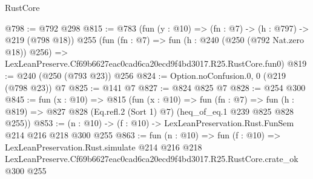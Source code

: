 \begin{lexlean}{RustCore}
\begin{coremodule}
@798 := @792 @298
@815 := @783
    (fun (y : @10) => (fn : @7) -> (h : @797) -> @219 (@798 @18))
    @255
    (fun (fn : @7) =>
    fun (h : @240 (@250 (@792 Nat.zero @18)) @256) =>
    LexLeanPreserve.Cf69b6627eac0cad6ca20ecd9f4bd3017.R25.RustCore.fun0)
@819 := @240 (@250 (@793 @23)) @256
@824 := Option.noConfusion.{0, 0} (@219 (@798 @23)) @7
@825 := @141 @7
@827 := @824 @825 @7
@828 := @254 @300
@845 := fun (x : @10) =>
  @815
    (fun (x : @10) =>
    fun (fn : @7) =>
    fun (h : @819) => @827 @828 (Eq.refl.{2} (Sort 1) @7) (heq_of_eq.{1} @239 @825 @828 @255))
@853 := (n : @10) -> (f : @10) -> LexLeanPreservation.Rust.FunSem @214 @216 @218 @300 @255
@863 := fun (n : @10) =>
  fun (f : @10) =>
  LexLeanPreservation.Rust.simulate
    @214
    @216
    @218
    LexLeanPreserve.Cf69b6627eac0cad6ca20ecd9f4bd3017.R25.RustCore.crate_ok
    @300
    @255
\end{coremodule}
\end{lexlean}
